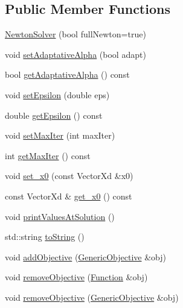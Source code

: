 \subsection*{Public Member Functions}
\begin{DoxyCompactItemize}
\item 
\hyperlink{classocra_1_1NewtonSolver_ab66a0ba4ef83a14fd2c7b39c2bae78b9}{Newton\+Solver} (bool full\+Newton=true)
\item 
void \hyperlink{classocra_1_1NewtonSolver_ade438475c7a8ffdc2bb60097639b8e27}{set\+Adaptative\+Alpha} (bool adapt)
\item 
bool \hyperlink{classocra_1_1NewtonSolver_aa0f49d597e69f641c28e35b038e91d99}{get\+Adaptative\+Alpha} () const
\item 
void \hyperlink{classocra_1_1NewtonSolver_ac128bd9e9d7c05ae3e91bddb362e7165}{set\+Epsilon} (double eps)
\item 
double \hyperlink{classocra_1_1NewtonSolver_a33f31688cb71c2ed817e3dbd40c0352f}{get\+Epsilon} () const
\item 
void \hyperlink{classocra_1_1NewtonSolver_a7bea41cafca30faf5dca35a7e3bd8a2e}{set\+Max\+Iter} (int max\+Iter)
\item 
int \hyperlink{classocra_1_1NewtonSolver_a044aa506a35d0a60bf8c5e4e7108dfae}{get\+Max\+Iter} () const
\item 
void \hyperlink{classocra_1_1NewtonSolver_a4fc7eba127f6975a0e8947f39d24629a}{set\+\_\+x0} (const Vector\+Xd \&x0)
\item 
const Vector\+Xd \& \hyperlink{classocra_1_1NewtonSolver_a073daf2d70c780313d28d34e6c8bbea2}{get\+\_\+x0} () const
\item 
void \hyperlink{classocra_1_1NewtonSolver_a92d33f1dfe684de2051d0389816cf9a5}{print\+Values\+At\+Solution} ()
\item 
std\+::string \hyperlink{classocra_1_1NewtonSolver_a3d498cc7771cf3cf733552a35fd77006}{to\+String} ()
\end{DoxyCompactItemize}
{\bf }\par
\begin{DoxyCompactItemize}
\item 
void \hyperlink{classocra_1_1NewtonSolver_a312cf17ad5b175d29a0fd7424449d630}{add\+Objective} (\hyperlink{namespaceocra_a37a91885f4fa5c523d22cb15d5673062}{Generic\+Objective} \&obj)
\item 
void \hyperlink{classocra_1_1NewtonSolver_a0f2c1366ef076469735020c20f759dd6}{remove\+Objective} (\hyperlink{classocra_1_1Function}{Function} \&obj)
\item 
void \hyperlink{classocra_1_1NewtonSolver_a99308db30e18ed33f7797c308e03ff92}{remove\+Objective} (\hyperlink{namespaceocra_a37a91885f4fa5c523d22cb15d5673062}{Generic\+Objective} \&obj)
\end{DoxyCompactItemize}


